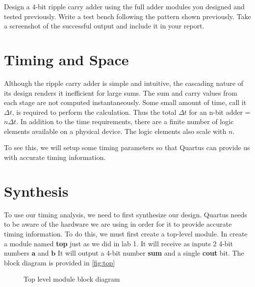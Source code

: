 \documentclass[12pt]{labmanual}
\begin{document}
\hfill\break
\begin{question}
    Design a 4-bit ripple carry adder using the full adder modules you designed and tested previously. Write a test bench following the pattern shown previously. Take a screenshot of the successful output and include it in your report.
\end{question}
\section{Timing and Space}
Although the ripple carry adder is simple and intuitive, the cascading nature of its design renders it inefficient for large sums. The sum and carry values from each stage are not computed instantaneously. Some small amount of time, call it $\Delta{t}$, is required to perform the calculation. Thus the total $\Delta{t}$ for an n-bit adder = $n\Delta{t}$. In addition to the time requirements, there are a finite number of logic elements available on a physical device. The logic elements also scale with $n$.

To see this, we will setup some timing parameters so that Quartus can provide us with accurate timing information.

\section{Synthesis}
To use our timing analysis, we need to first synthesize our design. Quartus needs to be aware of the hardware we are using in order for it to provide accurate timing information. To do this, we must first create a top-level module. In  create a module named \textbf{top} just as we did in lab 1. It will receive as inputs 2 4-bit numbers $\mathbf{a}$ and $\mathbf{b}$ It will output a 4-bit number \textbf{sum} and a single \textbf{cout} bit. The block diagram is provided in \autoref{fig:top}

\begin{figure}
    \centering
    \caption{Top level module block diagram}
    \label{fig:top}
\end{figure}
\end{document}
